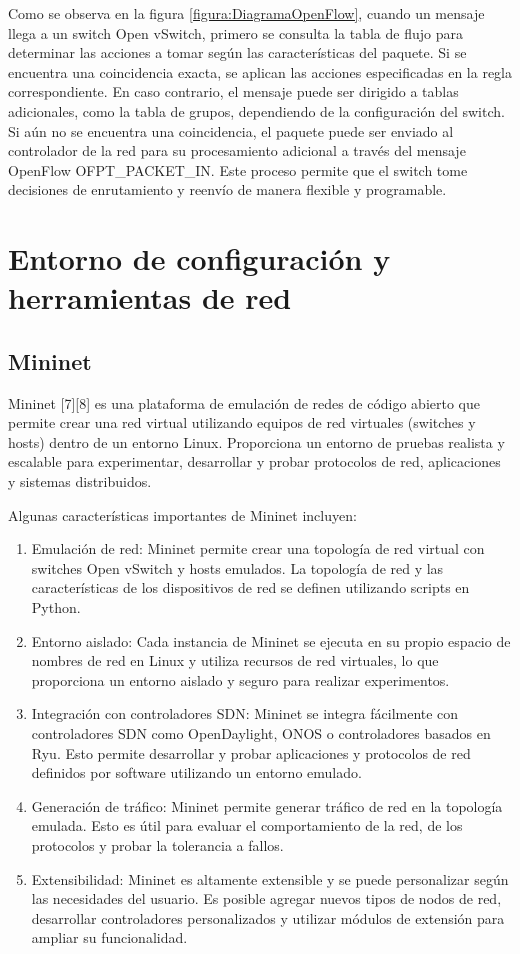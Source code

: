 \documentclass[a4paper, 12pt]{book}
\begin{document}
	Como se observa en la figura \ref{figura:DiagramaOpenFlow}, cuando un mensaje llega a un switch Open vSwitch, primero se consulta la tabla de flujo para determinar las acciones a tomar según las características del paquete. Si se encuentra una coincidencia exacta, se aplican las acciones especificadas en la regla correspondiente. En caso contrario, el mensaje puede ser dirigido a tablas adicionales, como la tabla de grupos, dependiendo de la configuración del switch. Si aún no se encuentra una coincidencia, el paquete puede ser enviado al controlador de la red para su procesamiento adicional a través del mensaje OpenFlow OFPT\_PACKET\_IN. Este proceso permite que el switch tome decisiones de enrutamiento y reenvío de manera flexible y programable.
	
	\section{Entorno de configuración y herramientas de red}
	\subsection{Mininet} 
	\label{sec:mininet}
	
	Mininet [7][8] es una plataforma de emulación de redes de código abierto que permite crear una red virtual utilizando equipos de red virtuales (switches y hosts) dentro de un entorno Linux. Proporciona un entorno de pruebas realista y escalable para experimentar, desarrollar y probar protocolos de red, aplicaciones y sistemas distribuidos.
	
	Algunas características importantes de Mininet incluyen:
	
	\begin{enumerate}
		\item 	Emulación de red: Mininet permite crear una topología de red virtual con switches Open vSwitch y hosts emulados. La topología de red y las características de los dispositivos de red se definen utilizando scripts en Python.
		\item 	Entorno aislado: Cada instancia de Mininet se ejecuta en su propio espacio de nombres de red en Linux y utiliza recursos de red virtuales, lo que proporciona un entorno aislado y seguro para realizar experimentos.
		\item 	Integración con controladores SDN: Mininet se integra fácilmente con controladores SDN como OpenDaylight, ONOS o controladores basados en Ryu. Esto permite desarrollar y probar aplicaciones y protocolos de red definidos por software utilizando un entorno emulado.
		\item 	Generación de tráfico: Mininet permite generar tráfico de red en la topología emulada. Esto es útil para evaluar el comportamiento de la red,  de los protocolos y probar la tolerancia a fallos.
		\item   Extensibilidad: Mininet es altamente extensible y se puede personalizar según las necesidades del usuario. Es posible agregar nuevos tipos de nodos de red, desarrollar controladores personalizados y utilizar módulos de extensión para ampliar su funcionalidad.
	\end{enumerate}
	
\end{document}

